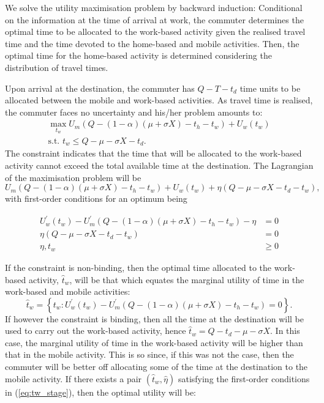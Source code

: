 \documentclass[12pt,a4paper,british]{article}
\theoremstyle{definition}
\theoremstyle{plain}
\theoremstyle{plain}
\begin{document}
We solve the utility maximisation problem by backward induction: Conditional
on the information at the time of arrival at work, the commuter determines
the optimal time to be allocated to the work-based activity given
the realised travel time and the time devoted to the home-based and
mobile activities. Then, the optimal time for the home-based activity
is determined considering the distribution of travel times.

Upon arrival at the destination, the commuter has $Q-T-t_{d}$ time
units to be allocated between the mobile and work-based activities.
As travel time is realised, the commuter faces no uncertainty and
his/her problem amounts to:
\begin{gather*}
\max_{t_{w}}U_{m}\left(Q-\left(1-\alpha\right)\left(\mu+\sigma X\right)-t_{h}-t_{w}\right)+U_{w}\left(t_{w}\right)\\
\mbox{s.t. }t_{w}\leq Q-\mu-\sigma X-t_{d}.
\end{gather*}
The constraint indicates that the time that will be allocated to the
work-based activity cannot exceed the total available time at the
destination. The Lagrangian of the maximisation problem will be
\[
U_{m}\left(Q-\left(1-\alpha\right)\left(\mu+\sigma X\right)-t_{h}-t_{w}\right)+U_{w}\left(t_{w}\right)+\eta\left(Q-\mu-\sigma X-t_{d}-t_{w}\right),
\]
with first-order conditions for an optimum being

\begin{subequations}

\label{eq:tw_stage}
\begin{align}
U_{w}^{\prime}\left(t_{w}\right)-U_{m}^{\prime}\left(Q-\left(1-\alpha\right)\left(\mu+\sigma X\right)-t_{h}-t_{w}\right)-\eta & =0\label{eq:stage2_wrt_tw}\\
\eta\left(Q-\mu-\sigma X-t_{d}-t_{w}\right) & =0\label{eq:stage2_compl}\\
\eta,t_{w} & \geq0\label{eq:stage2_nonnegative}
\end{align}

\end{subequations}

If the constraint is non-binding, then the optimal time allocated
to the work-based activity, $\hat{t}_{w}$, will be that which equates
the marginal utility of time in the work-based and mobile activities:
\[
\hat{t}_{w}=\left\{ t_{w}:U_{w}^{\prime}\left(t_{w}\right)-U_{m}^{\prime}\left(Q-\left(1-\alpha\right)\left(\mu+\sigma X\right)-t_{h}-t_{w}\right)=0\right\} .
\]
If however the constraint is binding, then all the time at the destination
will be used to carry out the work-based activity, hence $\hat{t}_{w}=Q-t_{d}-\mu-\sigma X$.
In this case, the marginal utility of time in the work-based activity
will be higher than that in the mobile activity. This is so since,
if this was not the case, then the commuter will be better off allocating
some of the time at the destination to the mobile activity. If there
exists a pair $\left(\hat{t}_{w},\hat{\eta}\right)$ satisfying the
first-order conditions in (\ref{eq:tw_stage}), then the optimal utility
will be:
\end{document}
